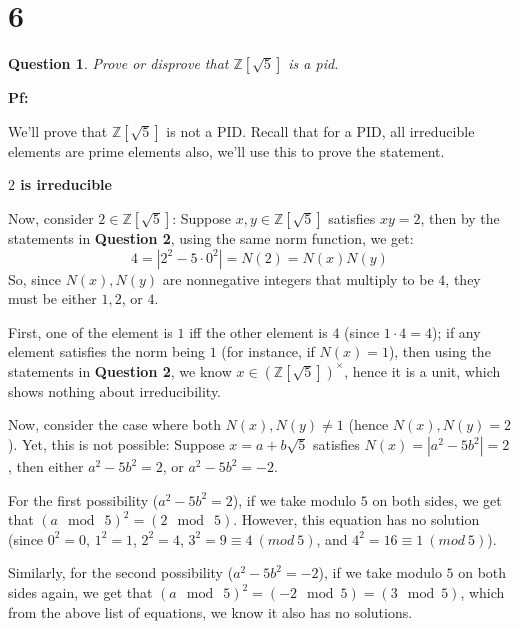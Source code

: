 \documentclass{article}
\newtheorem{question}{Question}
\begin{document}


\break

\section*{6}
\begin{myBox}[]{}
    \begin{question}
        Prove or disprove that $\mathbb{Z}[\sqrt{5}]$ is a pid.
    \end{question}
\end{myBox}

\textbf{Pf:}

We'll prove that $\mathbb{Z}[\sqrt{5}]$ is not a PID. Recall that for a PID, all irreducible elements are prime elements also, we'll use this to prove the statement.

\hfil

\textbf{$2$ is irreducible}

Now, consider $2\in\mathbb{Z}[\sqrt{5}]$: Suppose $x,y\in\mathbb{Z}[\sqrt{5}]$ satisfies $xy=2$, then by the statements in \textbf{Question 2},
using the same norm function, we get:
$$4=|2^2-5\cdot 0^2|=N(2)=N(x)N(y)$$
So, since $N(x),N(y)$ are nonnegative integers that multiply to be $4$, they must be either $1,2$, or $4$.

First, one of the element is $1$ iff the other element is $4$ (since $1\cdot 4 = 4$); if any element satisfies the norm being $1$ (for instance, if $N(x)=1$), 
then using the statements in \textbf{Question 2}, we know $x\in(\mathbb{Z}[\sqrt{5}])^\times$, hence it is a unit, which shows nothing about irreducibility.

\hfil

Now, consider the case where both $N(x),N(y)\neq 1$ (hence $N(x),N(y)=2$). Yet, this is not possible:
Suppose $x=a+b\sqrt{5}$ satisfies $N(x)=|a^2-5b^2| = 2$, then either $a^2-5b^2=2$, or $a^2-5b^2=-2$.

For the first possibility ($a^2-5b^2=2$), if we take modulo $5$ on both sides, we get that $(a\mod\ 5)^2 = (2\mod\ 5)$. However, this equation has no solution (since $0^2=0$, $1^2=1$, $2^2=4$, $3^2=9\equiv 4\ (mod\ 5)$, and $4^2=16\equiv 1\ (mod\ 5)$).

Similarly, for the second possibility ($a^2-5b^2=-2$), if we take modulo $5$ on both sides again, we get that $(a\mod\ 5)^2=(-2\mod 5)=(3\mod 5)$, which from the above list of equations,
we know it also has no solutions.
\end{document}
